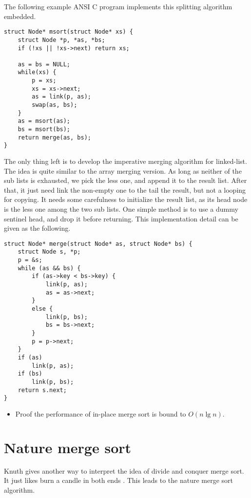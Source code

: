 \documentclass[UTF8]{article}
\begin{document}
The following example ANSI C program implements this splitting algorithm embedded.

\lstset{language=C}
\begin{lstlisting}
struct Node* msort(struct Node* xs) {
    struct Node *p, *as, *bs;
    if (!xs || !xs->next) return xs;

    as = bs = NULL;
    while(xs) {
        p = xs;
        xs = xs->next;
        as = link(p, as);
        swap(as, bs);
    }
    as = msort(as);
    bs = msort(bs);
    return merge(as, bs);
}
\end{lstlisting}

The only thing left is to develop the imperative merging algorithm for linked-list. The idea
is quite similar to the array merging version. As long as neither of the sub lists is exhausted,
we pick the less one, and append it to the result list. After that, it just need link the
non-empty one to the tail the result, but not a looping for copying. It needs some carefulness
to initialize the result list, as its head node is the less one among the two sub lists.
One simple method is to use a dummy sentinel head, and drop it before returning. This implementation
detail can be given as the following.

\lstset{language=C}
\begin{lstlisting}
struct Node* merge(struct Node* as, struct Node* bs) {
    struct Node s, *p;
    p = &s;
    while (as && bs) {
        if (as->key < bs->key) {
            link(p, as);
            as = as->next;
        }
        else {
            link(p, bs);
            bs = bs->next;
        }
        p = p->next;
    }
    if (as)
        link(p, as);
    if (bs)
        link(p, bs);
    return s.next;
}
\end{lstlisting}

\begin{Exercise}
\begin{itemize}
\item Proof the performance of in-place merge sort is bound to $O(n \lg n)$.
\end{itemize}
\end{Exercise}

\section{Nature merge sort}
Knuth gives another way to interpret the idea of divide and conquer merge sort. It just likes
burn a candle in both ends \cite{TAOCP}. This leads to the nature merge sort algorithm.
\end{document}
